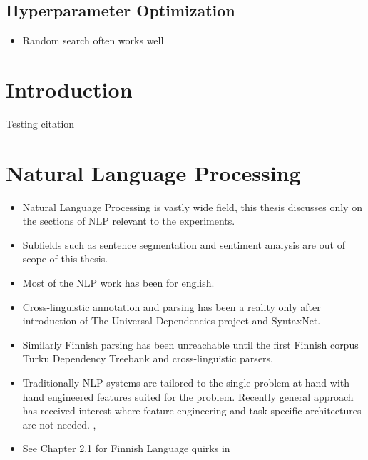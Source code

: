 \documentclass[12pt,a4paper,english
]{tutthesis}
\begin{document}
\section{Hyperparameter Optimization}
\label{se:hyperparameter_optimization}
\begin{itemize}
\item Random search often works well
\end{itemize}



\newpage

\if@twoside
\cleardoublepage
\fi

\setcounter{page}{1} %
\renewcommand{\chaptername}{} %


\chapter{Introduction}
\label{ch:intro}
Testing citation \cite{Andor2016}


\chapter{Natural Language Processing}
\label{ch:natural_language_processing}
\begin{itemize}
\item Natural Language Processing is vastly wide field, this thesis discusses only on the sections of NLP relevant to the experiments.
\item Subfields such as sentence segmentation and sentiment analysis are out of scope of this thesis.
\item Most of the NLP work has been for english.
\item Cross-linguistic annotation and parsing has been a reality only after introduction of The Universal Dependencies project and SyntaxNet.
\item Similarly Finnish parsing has been unreachable until the first Finnish corpus Turku Dependency Treebank \cite{Haverinen2014} and cross-linguistic parsers.
\item Traditionally NLP systems are tailored to the single problem at hand with hand engineered features suited for the problem. Recently general approach has received interest where feature engineering and task specific architectures are not needed. \cite{Collobert2011}, \cite{Zhang2015}
\item See Chapter 2.1 for Finnish Language quirks in \cite{Korenius2004}
\end{itemize}
\end{document}
